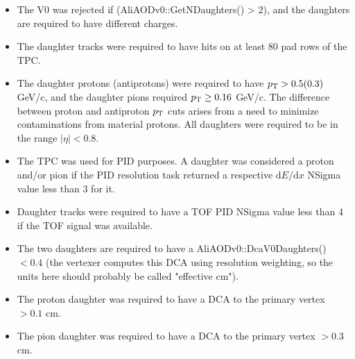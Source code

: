 \begin{itemize}
\item The V0 was rejected if (AliAODv0::GetNDaughters() > 2), and the daughters are required to have different charges.
\item The daughter tracks were required to have hits on at least 80 pad rows of the TPC.
\item The daughter protons (antiprotons) were required to have $p_{\rm T} > 0.5 (0.3)$ GeV/c, and the daughter pions required $p_{\rm T} \geq 0.16$ GeV/c. The difference between proton and antiproton $p_{\rm T}$ cuts arises from a need to minimize contaminations from material protons. All daughters were required to be in the range $|\eta| < 0.8$.
\item The TPC was used for PID purposes.  A daughter was considered a proton and/or pion if the PID resolution task returned a respective $\mathrm{d}E/\mathrm{d}x$ NSigma value less than 3 for it.
\item Daughter tracks were required to have a TOF PID NSigma value less than 4 if the TOF signal was available.
\item The two daughters are required to have a AliAODv0::DcaV0Daughters() $< 0.4$ (the vertexer computes this DCA using resolution weighting, so the units here should probably be called "effective cm").
\item The proton daughter was required to have a DCA to the primary vertex $> 0.1$ cm.
\item The pion daughter was required to have a DCA to the primary vertex $> 0.3$ cm.
\end{itemize}

